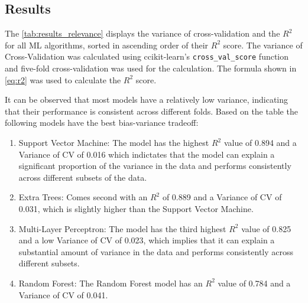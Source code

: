 \subsection{Results}\label{subsec:results3}

The \cref*{tab:results_relevance} displays the variance of cross-validation and the $R^2$ for all \ac{ML} algorithms,
sorted in ascending order of their $R^2$ score.
The variance of Cross-Validation was calculated using ccikit-learn's \texttt{cross\_val\_score} function and
five-fold cross-validation was used for the calculation.
The formula shown in \cref{eq:r2} was used to calculate the $R^2$ score.

It can be observed that most models have a relatively low variance, indicating that their performance is
consistent across different folds.
Based on the table the following models have the best bias-variance tradeoff:

\begin{enumerate}
    \item Support Vector Machine: The model has the highest $R^2$ value of 0.894 and a Variance of CV of
    0.016 which indictates that the model can explain a significant proportion of the variance in the data and
    performs consistently across different subsets of the data.
    \item Extra Trees: Comes second with an $R^2$ of 0.889 and a Variance of CV of 0.031, which is slightly higher
    than the Support Vector Machine.
    \item Multi-Layer Perceptron: The model has the third highest $R^2$ value of 0.825 and a low Variance
    of CV of 0.023, which implies that it can explain a substantial amount of variance in the data and
    performs consistently across different subsets.
    \item Random Forest: The Random Forest model has an $R^2$ value of 0.784 and a Variance of CV of 0.041.
\end{enumerate}


